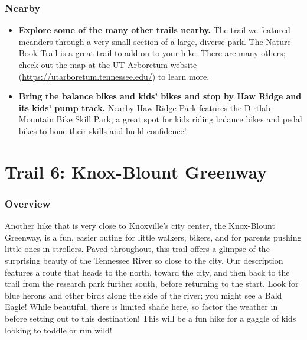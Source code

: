 \documentclass[
  letterpaper,
  DIV=11,
  numbers=noendperiod]{scrreprt}
\providecommand{\tightlist}{%
  \setlength{\itemsep}{0pt}\setlength{\parskip}{0pt}}\usepackage{longtable,booktabs,array}
\begin{document}
\subsection{Nearby}\label{nearby-4}

\begin{itemize}
\tightlist
\item
  \textbf{Explore some of the many other trails nearby.} The trail we
  featured meanders through a very small section of a large, diverse
  park. The Nature Book Trail is a great trail to add on to your hike.
  There are many others; check out the map at the UT Arboretum website
  (\url{https://utarboretum.tennessee.edu/}) to learn more.
\item
  \textbf{Bring the balance bikes and kids' bikes and stop by Haw Ridge
  and its kids' pump track.} Nearby Haw Ridge Park features the Dirtlab
  Mountain Bike Skill Park, a great spot for kids riding balance bikes
  and pedal bikes to hone their skills and build confidence!
\end{itemize}

\chapter{Trail 6: Knox-Blount
Greenway}\label{trail-6-knox-blount-greenway}

\subsection{Overview}\label{overview-6}

Another hike that is very close to Knoxville's city center, the
Knox-Blount Greenway, is a fun, easier outing for little walkers,
bikers, and for parents pushing little ones in strollers. Paved
throughout, this trail offers a glimpse of the surprising beauty of the
Tennessee River so close to the city. Our description features a route
that heads to the north, toward the city, and then back to the trail
from the research park further south, before returning to the start.
Look for blue herons and other birds along the side of the river; you
might see a Bald Eagle! While beautiful, there is limited shade here, so
factor the weather in before setting out to this destination! This will
be a fun hike for a gaggle of kids looking to toddle or run wild!
\end{document}
